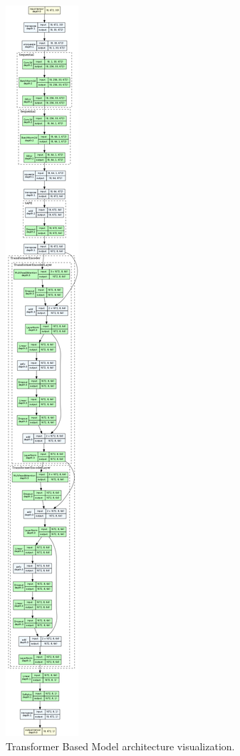 \begin{figure}[H]
	\centering
	\includegraphics[height=.9\textheight]{chapters/3_models/imgs/gab/transformerarchitecture.png}
	\caption{Transformer Based Model architecture visualization.}\label{fig:gabarchitecture}
\end{figure}

